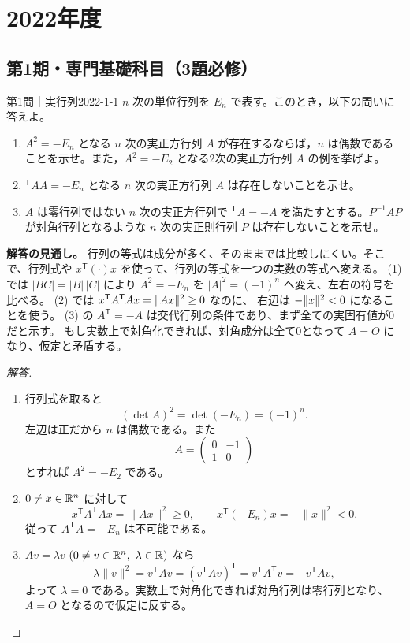 \chapter{2022年度}
\label{ch:2022}

\section{第1期・専門基礎科目（3題必修）}

\begin{problem}{第1問｜実行列}{2022-1-1}
$n$ 次の単位行列を $E_n$ で表す。このとき，以下の問いに答えよ。
\begin{enumerate}
  \item[(1)] $A^2=-E_n$ となる $n$ 次の実正方行列 $A$ が存在するならば，$n$ は偶数であることを示せ。また，$A^2=-E_2$ となる2次の実正方行列 $A$ の例を挙げよ。
  \item[(2)] ${}^{\mathsf T}AA=-E_n$ となる $n$ 次の実正方行列 $A$ は存在しないことを示せ。
  \item[(3)] $A$ は零行列ではない $n$ 次の実正方行列で ${}^{\mathsf T}A=-A$ を満たすとする。$P^{-1}AP$ が対角行列となるような $n$ 次の実正則行列 $P$ は存在しないことを示せ。
\end{enumerate}
\end{problem}
\begin{memo*}
\textbf{解答の見通し。}
行列の等式は成分が多く、そのままでは比較しにくい。そこで、行列式や
$x^{\mathsf T}(\cdot)x$ を使って、行列の等式を一つの実数の等式へ変える。
(1) では $|BC|=|B|\,|C|$ により $A^2=-E_n$ を
$|A|^2=(-1)^n$ へ変え、左右の符号を比べる。
(2) では $x^{\mathsf T}A^{\mathsf T}Ax=\lVert Ax \rVert^2\ge0$ なのに、
右辺は $-\lVert x \rVert^2<0$ になることを使う。
(3) の $A^{\mathsf T}=-A$ は交代行列の条件であり、まず全ての実固有値が0だと示す。
もし実数上で対角化できれば、対角成分は全て0となって $A=O$ になり、仮定と矛盾する。
\end{memo*}
\begin{proof}[解答]
\begin{enumerate}
  \item[(1)] 行列式を取ると
  \[
  (\det A)^2=\det(-E_n)=(-1)^n.
  \]
  左辺は正だから $n$ は偶数である。また
  \[
  A=\begin{pmatrix}0&-1\\1&0\end{pmatrix}
  \]
  とすれば $A^2=-E_2$ である。

  \item[(2)] $0\ne x\in\mathbb{R}^n$ に対して
  \[
  x^{\mathsf T}A^{\mathsf T}Ax=\|Ax\|^2\ge0,\qquad
  x^{\mathsf T}(-E_n)x=-\|x\|^2<0.
  \]
  従って $A^{\mathsf T}A=-E_n$ は不可能である。

  \item[(3)] $Av=\lambda v$ $(0\ne v\in\mathbb{R}^n,\ \lambda\in\mathbb{R})$ なら
  \[
  \lambda\|v\|^2=v^{\mathsf T}Av
  =(v^{\mathsf T}Av)^{\mathsf T}
  =v^{\mathsf T}A^{\mathsf T}v=-v^{\mathsf T}Av,
  \]
  よって $\lambda=0$ である。実数上で対角化できれば対角行列は零行列となり、
  $A=O$ となるので仮定に反する。
\end{enumerate}
\end{proof}

